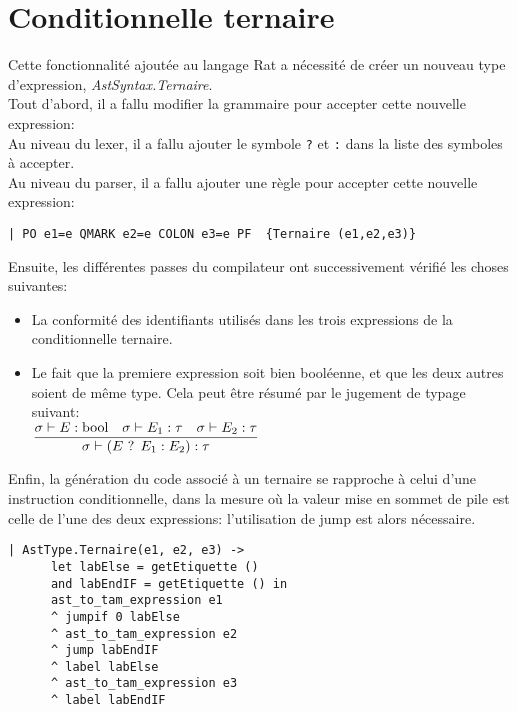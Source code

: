 \documentclass[french]{article}
\newcommand{\jugementTernaire}{
        \dfrac{\sigma \vdash E : \text{bool} \hspace*{10pt} \sigma \vdash E_1 : \tau \hspace*{10pt} \sigma \vdash E_2 : \tau }
              {\sigma \vdash (E \text{ ? } E_1 : E_2) : \tau}
        }
\begin{document}
\section{Conditionnelle ternaire}
Cette fonctionnalité ajoutée au langage Rat a nécessité de créer un nouveau type d'expression, \textit{AstSyntax.Ternaire}. \\
Tout d'abord, il a fallu modifier la grammaire pour accepter cette nouvelle expression: \\
Au niveau du lexer, il a fallu ajouter le symbole \texttt{?} et \texttt{:} dans la liste des symboles à accepter. \\
Au niveau du parser, il a fallu ajouter une règle pour accepter cette nouvelle expression: \\
\begin{lstlisting}
| PO e1=e QMARK e2=e COLON e3=e PF  {Ternaire (e1,e2,e3)}
\end{lstlisting}
Ensuite, les différentes passes du compilateur ont successivement vérifié les choses suivantes: \\
\begin{itemize}
        \item La conformité des identifiants utilisés dans les trois expressions de la conditionnelle ternaire.
        \item Le fait que la premiere expression soit bien booléenne, et que les deux autres soient de même type. Cela peut être résumé par le jugement de typage suivant: \\
        \(\jugementTernaire\) 
\end{itemize}
Enfin, la génération du code associé à un ternaire se rapproche à celui d'une instruction conditionnelle, 
dans la mesure où la valeur mise en sommet de pile est celle de l'une des deux expressions: l'utilisation de jump est alors nécessaire.
\begin{lstlisting}
| AstType.Ternaire(e1, e2, e3) -> 
      let labElse = getEtiquette ()
      and labEndIF = getEtiquette () in
      ast_to_tam_expression e1
      ^ jumpif 0 labElse
      ^ ast_to_tam_expression e2
      ^ jump labEndIF
      ^ label labElse
      ^ ast_to_tam_expression e3
      ^ label labEndIF
\end{lstlisting}
\end{document}
